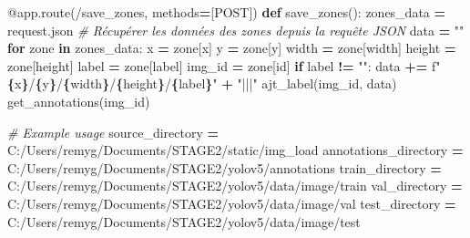 \documentclass[
  10pt,
]{article}
\newenvironment{Shaded}{\begin{snugshade}}{\end{snugshade}}
\newcommand{\AttributeTok}[1]{\textcolor[rgb]{0.13,0.29,0.53}{#1}}
\newcommand{\CommentTok}[1]{\textcolor[rgb]{0.56,0.35,0.01}{\textit{#1}}}
\newcommand{\ControlFlowTok}[1]{\textcolor[rgb]{0.13,0.29,0.53}{\textbf{#1}}}
\newcommand{\KeywordTok}[1]{\textcolor[rgb]{0.13,0.29,0.53}{\textbf{#1}}}
\newcommand{\NormalTok}[1]{#1}
\newcommand{\OperatorTok}[1]{\textcolor[rgb]{0.81,0.36,0.00}{\textbf{#1}}}
\newcommand{\SpecialCharTok}[1]{\textcolor[rgb]{0.81,0.36,0.00}{\textbf{#1}}}
\newcommand{\SpecialStringTok}[1]{\textcolor[rgb]{0.31,0.60,0.02}{#1}}
\newcommand{\StringTok}[1]{\textcolor[rgb]{0.31,0.60,0.02}{#1}}
\begin{document}
\begin{Shaded}
\begin{Highlighting}[]
\AttributeTok{@app.route}\NormalTok{(}\StringTok{\textquotesingle{}/save\_zones\textquotesingle{}}\NormalTok{, methods}\OperatorTok{=}\NormalTok{[}\StringTok{\textquotesingle{}POST\textquotesingle{}}\NormalTok{])}
\KeywordTok{def}\NormalTok{ save\_zones():}
\NormalTok{    zones\_data }\OperatorTok{=}\NormalTok{ request.json  }\CommentTok{\# Récupérer les données des zones depuis la requête JSON}
\NormalTok{    data }\OperatorTok{=} \StringTok{""}
    \ControlFlowTok{for}\NormalTok{ zone }\KeywordTok{in}\NormalTok{ zones\_data:}
\NormalTok{        x }\OperatorTok{=}\NormalTok{ zone[}\StringTok{\textquotesingle{}x\textquotesingle{}}\NormalTok{]}
\NormalTok{        y }\OperatorTok{=}\NormalTok{ zone[}\StringTok{\textquotesingle{}y\textquotesingle{}}\NormalTok{]}
\NormalTok{        width }\OperatorTok{=}\NormalTok{ zone[}\StringTok{\textquotesingle{}width\textquotesingle{}}\NormalTok{]}
\NormalTok{        height }\OperatorTok{=}\NormalTok{ zone[}\StringTok{\textquotesingle{}height\textquotesingle{}}\NormalTok{]}
\NormalTok{        label }\OperatorTok{=}\NormalTok{ zone[}\StringTok{\textquotesingle{}label\textquotesingle{}}\NormalTok{]}
\NormalTok{        img\_id }\OperatorTok{=}\NormalTok{ zone[}\StringTok{\textquotesingle{}id\textquotesingle{}}\NormalTok{]}
        \ControlFlowTok{if}\NormalTok{ label }\OperatorTok{!=} \StringTok{""}\NormalTok{:}
\NormalTok{            data }\OperatorTok{+=} \SpecialStringTok{f"}\SpecialCharTok{\{}\NormalTok{x}\SpecialCharTok{\}}\SpecialStringTok{/}\SpecialCharTok{\{}\NormalTok{y}\SpecialCharTok{\}}\SpecialStringTok{/}\SpecialCharTok{\{}\NormalTok{width}\SpecialCharTok{\}}\SpecialStringTok{/}\SpecialCharTok{\{}\NormalTok{height}\SpecialCharTok{\}}\SpecialStringTok{/}\SpecialCharTok{\{}\NormalTok{label}\SpecialCharTok{\}}\SpecialStringTok{"} \OperatorTok{+} \StringTok{"|||"}
\NormalTok{    ajt\_label(img\_id, data)}
\NormalTok{    get\_annotations(img\_id)}
    
    \CommentTok{\# Example usage}
\NormalTok{    source\_directory }\OperatorTok{=} \StringTok{\textquotesingle{}C:/Users/remyg/Documents/STAGE2/static/img\_load\textquotesingle{}}
\NormalTok{    annotations\_directory }\OperatorTok{=} \StringTok{\textquotesingle{}C:/Users/remyg/Documents/STAGE2/yolov5/annotations\textquotesingle{}}
\NormalTok{    train\_directory }\OperatorTok{=} \StringTok{\textquotesingle{}C:/Users/remyg/Documents/STAGE2/yolov5/data/image/train\textquotesingle{}}
\NormalTok{    val\_directory }\OperatorTok{=} \StringTok{\textquotesingle{}C:/Users/remyg/Documents/STAGE2/yolov5/data/image/val\textquotesingle{}}
\NormalTok{    test\_directory }\OperatorTok{=} \StringTok{\textquotesingle{}C:/Users/remyg/Documents/STAGE2/yolov5/data/image/test\textquotesingle{}}


\end{Highlighting}
\end{Shaded}
\end{document}
